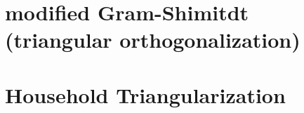 \section{modified Gram-Shimitdt (triangular orthogonalization)}





\section{Household Triangularization}






